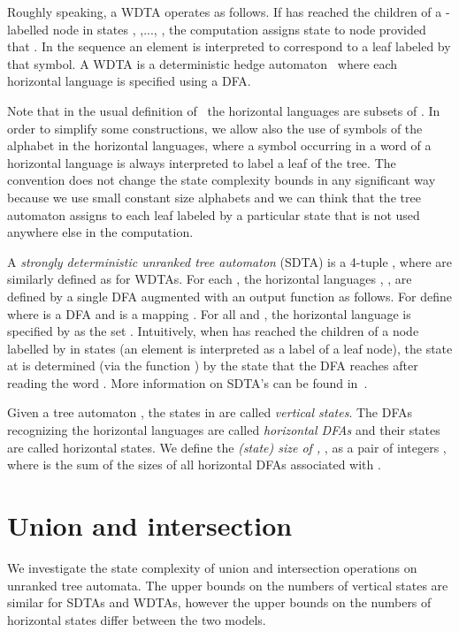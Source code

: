 \documentclass[copyright]{eptcs}
\begin{document}
Roughly speaking, a WDTA operates as follows.
If  has reached the children of a
-labelled node  in states
 ,  ,..., , the
computation assigns state  to node  provided that
. In the sequence
 an element  is interpreted to
correspond to a leaf labeled by that symbol.
A WDTA is a deterministic
hedge automaton~\cite{CDG} where each horizontal language
is specified using a DFA.

Note that in the usual definition of~\cite{CDG} the
horizontal languages
are subsets of . In order to simplify some constructions,
 we allow also the use of symbols  of the
alphabet  in the horizontal languages, where
a symbol  occurring in a word of
a horizontal language is always interpreted to label
a leaf of the tree.
The convention does not
change the state complexity bounds in any
significant way because we use small
constant size alphabets and we can think that the tree automaton
assigns to each leaf labeled by  a particular
state that is not used anywhere else in the computation.

A {\em strongly deterministic unranked tree automaton} (SDTA) is a
4-tuple , where  are
similarly defined as for WDTAs. For each , the
horizontal languages , , are defined by a
single DFA augmented with an output function as follows. For  define  where  is a
DFA and  is a mapping . For all  and , the horizontal language 
is specified by  as the set . Intuitively, when  has
reached the children of a node  labelled by  in states  (an element  is interpreted as a
label of a leaf node), the state at  is determined (via the
function ) by the state that the DFA  reaches
after reading the word . More information on
SDTA's can be found in~\cite{CLT}.

Given a tree automaton , the states in 
are called {\em vertical states\/}. The DFAs recognizing
the horizontal languages are called {\em horizontal
DFAs\/} and their states
 are called horizontal states.
We define the {\em (state) size of ,}  , as a pair of integers , where
 is the sum of the sizes of all horizontal DFAs associated
with .





\section{Union and intersection}

We investigate the state complexity of union and intersection
operations on unranked tree automata. The upper bounds on the
numbers of vertical states are similar for SDTAs and WDTAs,
however the upper bounds on the numbers of horizontal states
differ between the two models.
\end{document}
